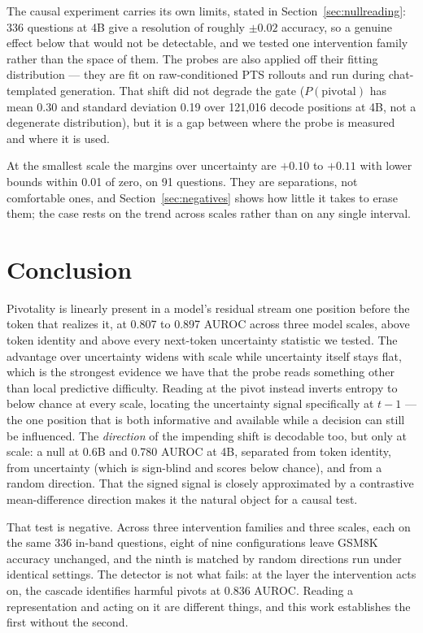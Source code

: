 \documentclass{article}
\begin{document}
The causal experiment carries its own limits, stated in
Section~\ref{sec:nullreading}: 336 questions at 4B give a resolution of
roughly $\pm 0.02$ accuracy, so a genuine effect below that would not be
detectable, and we tested one intervention family rather than the space of
them. The probes are also applied off their fitting distribution --- they
are fit on raw-conditioned PTS rollouts and run during chat-templated
generation. That shift did not degrade the gate ($P(\text{pivotal})$ has
mean 0.30 and standard deviation 0.19 over 121{,}016 decode positions at
4B, not a degenerate distribution), but it is a gap between where the
probe is measured and where it is used.

At the smallest scale the margins over uncertainty are $+0.10$ to $+0.11$
with lower bounds within 0.01 of zero, on 91 questions. They are
separations, not comfortable ones, and Section~\ref{sec:negatives} shows
how little it takes to erase them; the case rests on the trend across
scales rather than on any single interval.

\section{Conclusion}

Pivotality is linearly present in a model's residual stream one position
before the token that realizes it, at 0.807 to 0.897 AUROC across three
model scales, above token identity and above every next-token uncertainty
statistic we tested. The advantage over uncertainty widens with scale while
uncertainty itself stays flat, which is the strongest evidence we have that
the probe reads something other than local predictive difficulty. Reading
at the pivot instead inverts entropy to below chance at every scale,
locating the uncertainty signal specifically at $t-1$ --- the one position
that is both informative and available while a decision can still be
influenced. The \emph{direction} of the impending shift is
decodable too, but only at scale: a null at 0.6B and 0.780 AUROC at 4B,
separated from token identity, from uncertainty (which is sign-blind and
scores below chance), and from a random direction. That the signed signal
is closely approximated by a contrastive mean-difference direction makes it
the natural object for a causal test.

That test is negative. Across three intervention families and three
scales, each on the same 336 in-band questions, eight of nine
configurations leave GSM8K accuracy unchanged, and the ninth is matched by
random directions run under identical settings. The detector is not what
fails: at the layer the intervention acts on, the cascade identifies
harmful pivots at 0.836 AUROC. Reading a representation and acting on it
are different things, and this work establishes the first without the
second.
\end{document}
